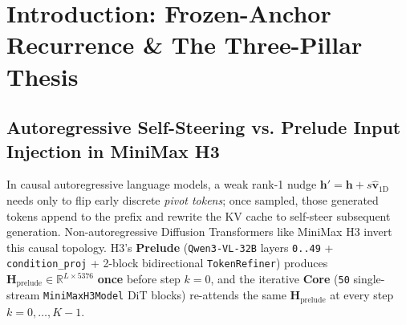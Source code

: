 \documentclass[10pt]{article}
\begin{document}
\begin{abstract}
\texttt{.safetensors}, \texttt{5} retired including \texttt{stained\_glass\_cathedral} at \texttt{mpc = 0.762} $\to$ \texttt{0/2} \texttt{t=1} screening), document an honest Regime B case study (\texttt{de\_llm\_slop}), falsify unsupervised \texttt{Path 1B} token routing on CPU (\texttt{< 1.1\%} MSE), and settle all three Phase 2 GPU gates (\texttt{1152x768}, \texttt{MiniMaxH3Sol}): verifying live \texttt{1x audio\_only + late\_30\_49} (\texttt{rgb\_mae = 7.461}), \texttt{1x video\_only} (\texttt{0.984x}, \texttt{-0.039 st} paired \texttt{YIN} $F_0$), \texttt{345f} Sol parity, and \texttt{192f} multi-scene evaluation across \texttt{4} verified stems (\texttt{charcoal\_sketch\_animated}, \texttt{x\_ray\_fluoroscope}, \texttt{mercury\_liquid\_chrome}, \texttt{blacklight\_uv\_rave}), while honestly rejecting \texttt{Bus-Scoped V\_r} promotion (\texttt{uv+reverb} exposure blowout), falsifying \texttt{Path 1C} \texttt{ColQwen} \texttt{vision\_tokens} Dual-Lock (\texttt{hsv\_sat = 0.2432} vs. base \texttt{0.2477}), and falsifying \texttt{1x Q\_vid[mask]} splicing against \texttt{2x MiniMaxH3Sol} (\texttt{1.047x-1.090x} portal contrast with layout drift vs. \texttt{1.421x} on \texttt{2x}).

\end{abstract}

\section{Introduction: Frozen-Anchor Recurrence \& The Three-Pillar Thesis}

\subsection{Autoregressive Self-Steering vs. Prelude Input Injection in MiniMax H3}

In causal autoregressive language models, a weak rank-1 nudge $\mathbf{h}' = \mathbf{h} + s\hat{\mathbf{v}}_{\text{1D}}$ needs only to flip early discrete \emph{pivot tokens}; once sampled, those generated tokens append to the prefix and rewrite the KV cache to self-steer subsequent generation. Non-autoregressive Diffusion Transformers like MiniMax H3 invert this causal topology. H3's \textbf{Prelude} (\texttt{Qwen3-VL-32B} layers \texttt{0..49} + \texttt{condition\_proj} + 2-block bidirectional \texttt{TokenRefiner}) produces $\mathbf{H}_{\text{prelude}} \in \mathbb{R}^{L \times 5376}$ \textbf{once} before step $k = 0$, and the iterative \textbf{Core} (\texttt{50} single-stream \texttt{MiniMaxH3Model} DiT blocks) re-attends the same $\mathbf{H}_{\text{prelude}}$ at every step $k = 0,\dots,K-1$.
\end{document}
